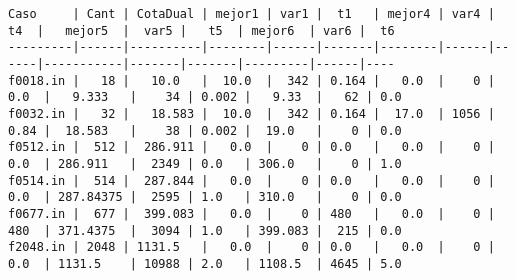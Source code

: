 \documentclass[11pt, a4paper, pdftex]{article}
\begin{document}
\newpage
\begin{landscape}
\begin{table}[ht]
\centering
{}
\caption{Resultados del Script}
\end{table}
\end{landscape}

\newpage

\begin{turn}{90}
\begin{minipage}{\textheight}
\begin{verbatim}
Caso     | Cant | CotaDual | mejor1 | var1 |  t1   | mejor4 | var4 |  t4  |   mejor5  |  var5 |   t5  | mejor6  | var6 |  t6
---------|------|----------|--------|------|-------|--------|------|------|-----------|-------|-------|---------|------|----
f0018.in |   18 |   10.0   |  10.0  |  342 | 0.164 |   0.0  |    0 | 0.0  |   9.333   |    34 | 0.002 |   9.33  |   62 | 0.0
f0032.in |   32 |   18.583 |  10.0  |  342 | 0.164 |  17.0  | 1056 | 0.84 |  18.583   |    38 | 0.002 |  19.0   |    0 | 0.0
f0512.in |  512 |  286.911 |   0.0  |    0 | 0.0   |   0.0  |    0 | 0.0  | 286.911   |  2349 | 0.0   | 306.0   |    0 | 1.0
f0514.in |  514 |  287.844 |   0.0  |    0 | 0.0   |   0.0  |    0 | 0.0  | 287.84375 |  2595 | 1.0   | 310.0   |    0 | 0.0
f0677.in |  677 |  399.083 |   0.0  |    0 | 480   |   0.0  |    0 | 480  | 371.4375  |  3094 | 1.0   | 399.083 |  215 | 0.0
f2048.in | 2048 | 1131.5   |   0.0  |    0 | 0.0   |   0.0  |    0 | 0.0  | 1131.5    | 10988 | 2.0   | 1108.5  | 4645 | 5.0
\end{verbatim}
\end{minipage}
\end{turn}
\end{document}

